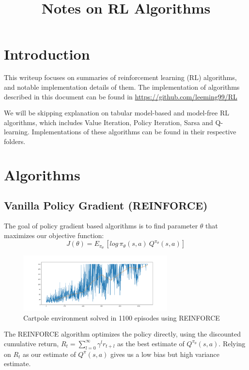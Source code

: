 \documentclass[11pt]{article} %
\title{Notes on RL Algorithms}
\author{}
\date{}
\begin{document}
\maketitle

\tableofcontents

\newpage

\section{Introduction}
This writeup focuses on summaries of reinforcement learning (RL) algorithms, and notable implementation details of them. The implementation of algorithms described in this document can be found in \url{https://github.com/leeming99/RL}

We will be skipping explanation on tabular model-based and model-free RL algorithms, which includes Value Iteration, Policy Iteration, Sarsa and Q-learning. Implementations of these algorithms can be found in their respective folders.
\section{Algorithms}
\subsection{Vanilla Policy Gradient (REINFORCE)}
The goal of policy gradient based algorithms is to find parameter $\theta$ that maximizes our objective function:
\begin{equation*}
    J(\theta) = E_{\pi_\theta}\,[log\,\pi_\theta(s,a)\: Q^{\pi_\theta}(s,a)]
\end{equation*}
\begin{figure}
    \centering
    \includegraphics[width=0.7\textwidth]{vanilla_policy_gradient/Solved_cartpole_1100eps.png}
    \caption{Cartpole environment solved in 1100 episodes using REINFORCE}
\end{figure}
The REINFORCE algorithm \cite{reinforce} optimizes the policy directly, using the discounted cumulative return, $R_t = \sum_{l=0}^\infty \gamma^l r_{t+l}$ as the best estimate of $Q^{\pi_\theta}(s,a)$. Relying on $R_t$ as our estimate of $Q^{\pi}(s,a)$ gives us a low bias but high variance estimate. 
\end{document}
